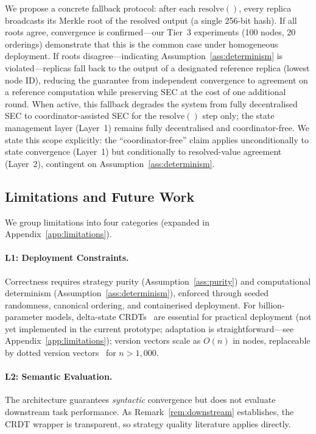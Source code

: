 \documentclass[10pt,letterpaper]{article}
\begin{document}
We propose a concrete fallback protocol: after each $\mathrm{resolve}()$, every replica broadcasts its Merkle root of the resolved output (a single 256-bit hash).
If all roots agree, convergence is confirmed---our Tier~3 experiments (100 nodes, 20 orderings) demonstrate that this is the common case under homogeneous deployment.
If roots disagree---indicating Assumption~\ref{ass:determinism} is violated---replicas fall back to the output of a designated reference replica (lowest node ID), reducing the guarantee from independent convergence to agreement on a reference computation while preserving SEC at the cost of one additional round.
When active, this fallback degrades the system from fully decentralised SEC to coordinator-assisted SEC for the $\mathrm{resolve}()$ step only; the state management layer (Layer~1) remains fully decentralised and coordinator-free.
We state this scope explicitly: the ``coordinator-free'' claim applies unconditionally to state convergence (Layer~1) but conditionally to resolved-value agreement (Layer~2), contingent on Assumption~\ref{ass:determinism}.

\subsection{Limitations and Future Work}\label{sec:limitations}

We group limitations into four categories (expanded in Appendix~\ref{app:limitations}).

\paragraph{L1: Deployment Constraints.}
Correctness requires strategy purity (Assumption~\ref{ass:purity}) and computational determinism (Assumption~\ref{ass:determinism}), enforced through seeded randomness, canonical ordering, and containerised deployment.
For billion-parameter models, delta-state CRDTs~\cite{almeida2018delta} are essential for practical deployment (not yet implemented in the current prototype; adaptation is straightforward---see Appendix~\ref{app:limitations}); version vectors scale as $O(n)$ in nodes, replaceable by dotted version vectors~\cite{preguica2018conflict} for $n > 1{,}000$.

\paragraph{L2: Semantic Evaluation.}
The architecture guarantees \emph{syntactic} convergence but does not evaluate downstream task performance.
As Remark~\ref{rem:downstream} establishes, the CRDT wrapper is transparent, so strategy quality literature applies directly.
\end{document}
